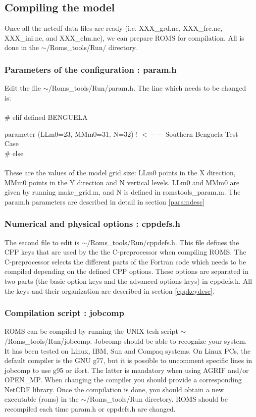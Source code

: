 \subsection{Compiling the model}

Once all the netcdf data files are ready (i.e. XXX\_grd.nc,
XXX\_frc.nc, XXX\_ini.nc, and XXX\_clm.nc), we can prepare ROMS for
compilation. All is done in the $\sim$/Roms\_tools/Run/ directory.

\subsubsection{Parameters of the configuration : param.h}
Edit the file $\sim$/Roms\_tools/Run/param.h.
The line which needs to be changed is:\\\\
\# elif defined BENGUELA

parameter (LLm0=23, MMm0=31, N=32)  ! $<--$ Southern Benguela Test Case\\
\#  else\\
\\
These are the values of the model grid size: LLm0 points in the X direction, MMm0
points in the Y direction and N vertical levels.  LLm0 and MMm0 are given by running
make\_grid.m, and N is defined in romstools\_param.m. The param.h parameters are
described in detail in section \ref{paramdesc}

\subsubsection{Numerical and physical options : cppdefs.h}
The second file to edit is $\sim$/Roms\_tools/Run/cppdefs.h.  This file defines the
CPP keys that are used by the the C-preprocessor when compiling ROMS. The
C-preprocessor selects the different parts of the Fortran code which needs to be
compiled depending on the defined CPP options. These options are separated in two
parts (the basic option keys and the advanced options keys) in cppdefs.h. All the
keys and their organization are described in section \ref{cppkeydesc}. \\

\subsubsection{Compilation script :  jobcomp}
ROMS can be compiled by running the UNIX tcsh script $\sim$/Roms\_tools/Run/jobcomp.
Jobcomp should be able to recognize your system. It has been tested on Linux, IBM,
Sun and Compaq systems. On Linux PCs, the default compiler is the GNU g77, but it is
possible to uncomment specific lines in jobcomp to use g95 or ifort.  The latter is
mandatory when using AGRIF and/or OPEN\_MP.  When changing the compiler you should
provide a corresponding NetCDF library.  Once the compilation is done, you should
obtain a new executable (roms) in the $\sim$/Roms\_tools/Run directory.  ROMS should
be recompiled each time param.h or cppdefs.h are changed.

